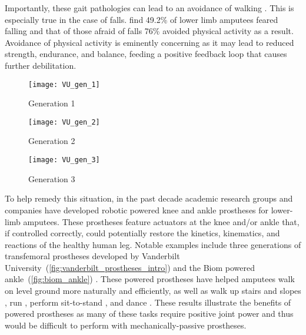 Importantly, these gait pathologies can lead to an avoidance of walking
\citep{gauthier1999enabling}. This is especially true in the case of falls.
\citet{miller2001prevalence} find 49.2\% of lower limb amputees feared falling
and that of those afraid of falls 76\% avoided physical activity as a result.
Avoidance of physical activity is eminently concerning as it may lead to reduced
strength, endurance, and balance, feeding a positive feedback loop that causes
further debilitation.
\begin{figure*}[b]
    \centering
	\begin{subfigure}[b]{0.3\textwidth}
    	\centering
        \texttt{[image: VU\_gen\_1]}
        \caption{Generation 1}
	\end{subfigure}
	\begin{subfigure}[b]{0.3\textwidth}
    	\centering
        \texttt{[image: VU\_gen\_2]}
        \caption{Generation 2}
	\end{subfigure}
	\begin{subfigure}[b]{0.3\textwidth}
    	\centering
        \texttt{[image: VU\_gen\_3]}
        \caption{Generation 3}
	\end{subfigure}
    \caption{Vanderbilt University's Robotic Transfemoral
    Prostheses. Images courtesy of Michael Goldfarb.\vspace{0.1in}}
    \label{fig:vanderbilt_prostheses_intro}
\end{figure*}

To help remedy this situation, in the past decade academic research groups and
companies have developed robotic powered knee and ankle prostheses for
lower-limb amputees.  These prostheses feature actuators at the knee and/or
ankle that, if controlled correctly, could potentially restore the kinetics,
kinematics, and reactions of the healthy human leg. Notable examples include
three generations of transfemoral prostheses developed by Vanderbilt
University~(\cref{fig:vanderbilt_prostheses_intro}) \citep{sup2009preliminary,
lawson2013control, lawson2014robotic} and the Biom powered
ankle~(\cref{fig:biom_ankle}) \citep{herr2012bionic}. These powered prostheses
have helped amputees walk on level ground more naturally and efficiently, as
well as walk up stairs and slopes \citep{sup2011upslope, lawson2013control}, run
\citep{huff2012running, shultz2015running}, perform sit-to-stand
\citep{varol2009powered}, and dance \citep{rouse2015design}. These results
illustrate the benefits of powered prostheses as many of these tasks require
positive joint power and thus would be difficult to perform with
mechanically-passive prostheses.

